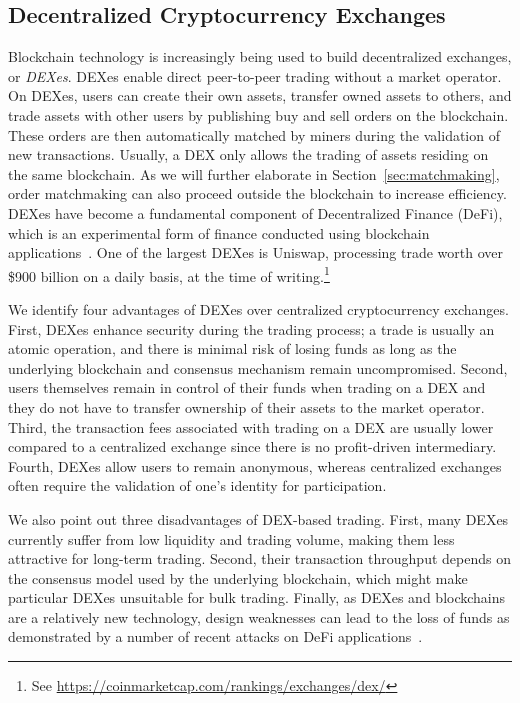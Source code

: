 
\subsection{Decentralized Cryptocurrency Exchanges}
Blockchain technology is increasingly being used to build decentralized exchanges, or \emph{DEXes}.
DEXes enable direct peer-to-peer trading without a market operator.
On DEXes, users can create their own assets, transfer owned assets to others, and trade assets with other users by publishing buy and sell orders on the blockchain.
These orders are then automatically matched by miners during the validation of new transactions.
Usually, a DEX only allows the trading of assets residing on the same blockchain.
As we will further elaborate in Section~\ref{sec:matchmaking}, order matchmaking can also proceed outside the blockchain to increase efficiency.
DEXes have become a fundamental component of Decentralized Finance (DeFi), which is an experimental form of finance conducted using blockchain applications~\cite{chen2020blockchain}.
One of the largest DEXes is Uniswap, processing trade worth over \$900 billion on a daily basis, at the time of writing.\footnote{See \url{https://coinmarketcap.com/rankings/exchanges/dex/}}

We identify four advantages of DEXes over centralized cryptocurrency exchanges.
First, DEXes enhance security during the trading process; a trade is usually an atomic operation, and there is minimal risk of losing funds as long as the underlying blockchain and consensus mechanism remain uncompromised.
Second, users themselves remain in control of their funds when trading on a DEX and they do not have to transfer ownership of their assets to the market operator.
Third, the transaction fees associated with trading on a DEX are usually lower compared to a centralized exchange since there is no profit-driven intermediary.
Fourth, DEXes allow users to remain anonymous, whereas centralized exchanges often require the validation of one's identity for participation.

We also point out three disadvantages of DEX-based trading.
First, many DEXes currently suffer from low liquidity and trading volume, making them less attractive for long-term trading.
Second, their transaction throughput depends on the consensus model used by the underlying blockchain, which might make particular DEXes unsuitable for bulk trading.
Finally, as DEXes and blockchains are a relatively new technology, design weaknesses can lead to the loss of funds as demonstrated by a number of recent attacks on DeFi applications~\cite{gudgeon2020decentralized,qin2020attacking}.

